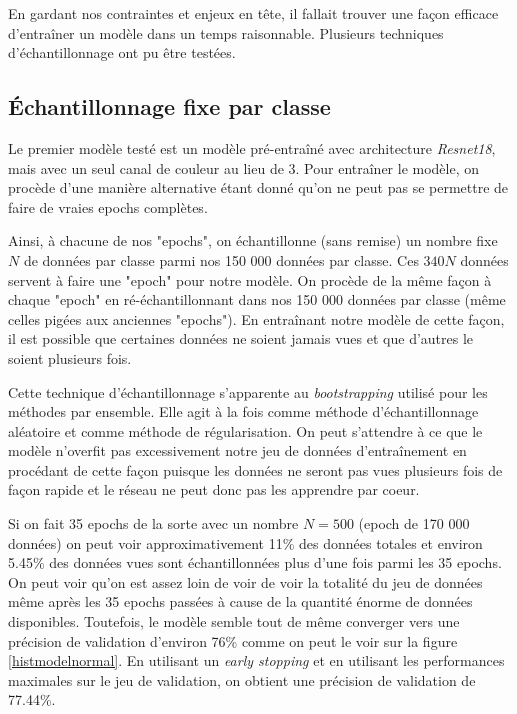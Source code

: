 En gardant nos contraintes et enjeux en tête, il fallait trouver une façon efficace d'entraîner un modèle dans un temps raisonnable. Plusieurs techniques d'échantillonnage ont pu être testées.


\subsection{Échantillonnage fixe par classe}

Le premier modèle testé est un modèle pré-entraîné avec architecture \emph{Resnet18}, mais avec un seul canal de couleur au lieu de 3. Pour entraîner le modèle, on procède d'une manière alternative étant donné qu'on ne peut pas se permettre de faire de vraies epochs complètes. 



Ainsi, à chacune de nos "epochs", on échantillonne (sans remise) un nombre fixe $N$ de données par classe parmi nos 150 000 données par classe. Ces $340N$ données servent à faire une "epoch"  pour notre modèle. On procède de la même façon à chaque "epoch" en ré-échantillonnant dans nos 150 000 données par classe (même celles pigées aux anciennes "epochs"). 
En entraînant notre modèle de cette façon, il est possible que certaines données ne soient jamais vues et que d'autres le soient plusieurs fois.


Cette technique d'échantillonnage s'apparente au \emph{bootstrapping} utilisé pour les méthodes par ensemble. Elle agit à la fois comme méthode d'échantillonnage aléatoire et comme méthode de régularisation. 
On peut s'attendre à ce que le modèle n'overfit pas excessivement notre jeu de données d'entraînement en procédant de cette façon puisque les données ne seront pas vues plusieurs fois de façon rapide et le réseau ne peut donc pas les apprendre par coeur.


Si on fait 35 epochs de la sorte avec un nombre $N=500$ (epoch de 170 000 données) on peut voir approximativement 11\% des données totales et environ 5.45\% des données vues sont échantillonnées plus d'une fois parmi les 35 epochs. 
On peut voir qu'on est assez loin de voir de voir la totalité du jeu de données même après les 35 epochs passées à cause de la quantité énorme de données disponibles. 
Toutefois, le modèle semble tout de même converger vers une précision de validation d'environ 76\% comme on peut le voir sur la figure \ref{histmodelnormal}. 
En utilisant un \emph{early stopping} et en utilisant les performances maximales sur le jeu de validation, on obtient une précision de validation de 77.44\%.


